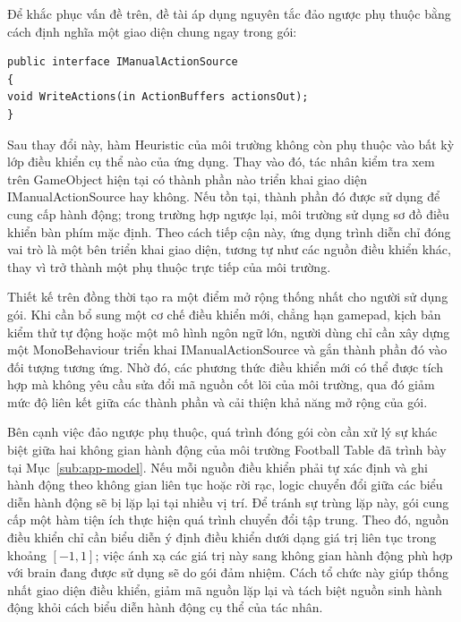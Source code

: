 \indent Để khắc phục vấn đề trên, đề tài áp dụng nguyên tắc đảo ngược phụ thuộc bằng cách định nghĩa một giao diện chung ngay trong gói:

\begin{lstlisting}[language={[Sharp]C}, caption={Giao diện cho nguồn điều khiển thủ công}]
public interface IManualActionSource
{
void WriteActions(in ActionBuffers actionsOut);
}
\end{lstlisting}

\indent Sau thay đổi này, hàm Heuristic của môi trường không còn phụ thuộc vào bất kỳ lớp điều khiển cụ thể nào của ứng dụng. Thay vào đó, tác nhân kiểm tra xem trên GameObject hiện tại có thành phần nào triển khai giao diện IManualActionSource hay không. Nếu tồn tại, thành phần đó được sử dụng để cung cấp hành động; trong trường hợp ngược lại, môi trường sử dụng sơ đồ điều khiển bàn phím mặc định. Theo cách tiếp cận này, ứng dụng trình diễn chỉ đóng vai trò là một bên triển khai giao diện, tương tự như các nguồn điều khiển khác, thay vì trở thành một phụ thuộc trực tiếp của môi trường.

\indent Thiết kế trên đồng thời tạo ra một điểm mở rộng thống nhất cho người sử dụng gói. Khi cần bổ sung một cơ chế điều khiển mới, chẳng hạn gamepad, kịch bản kiểm thử tự động hoặc một mô hình ngôn ngữ lớn, người dùng chỉ cần xây dựng một MonoBehaviour triển khai IManualActionSource và gắn thành phần đó vào đối tượng tương ứng. Nhờ đó, các phương thức điều khiển mới có thể được tích hợp mà không yêu cầu sửa đổi mã nguồn cốt lõi của môi trường, qua đó giảm mức độ liên kết giữa các thành phần và cải thiện khả năng mở rộng của gói.

\indent Bên cạnh việc đảo ngược phụ thuộc, quá trình đóng gói còn cần xử lý sự khác biệt giữa hai không gian hành động của môi trường Football Table đã trình bày tại Mục~\ref{sub:app-model}. Nếu mỗi nguồn điều khiển phải tự xác định và ghi hành động theo không gian liên tục hoặc rời rạc, logic chuyển đổi giữa các biểu diễn hành động sẽ bị lặp lại tại nhiều vị trí. Để tránh sự trùng lặp này, gói cung cấp một hàm tiện ích thực hiện quá trình chuyển đổi tập trung. Theo đó, nguồn điều khiển chỉ cần biểu diễn ý định điều khiển dưới dạng giá trị liên tục trong khoảng $[-1,1]$; việc ánh xạ các giá trị này sang không gian hành động phù hợp với brain đang được sử dụng sẽ do gói đảm nhiệm. Cách tổ chức này giúp thống nhất giao diện điều khiển, giảm mã nguồn lặp lại và tách biệt nguồn sinh hành động khỏi cách biểu diễn hành động cụ thể của tác nhân.


